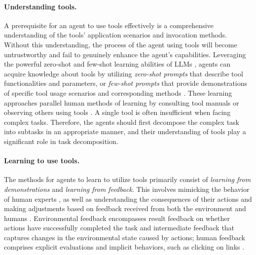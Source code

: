 \paragraph{Understanding tools.}
A prerequisite for an agent to use tools effectively is a comprehensive understanding of the tools' application scenarios and invocation methods. Without this understanding, the process of the agent using tools will become untrustworthy and fail to genuinely enhance the agent's capabilities. Leveraging the powerful zero-shot and few-shot learning abilities of LLMs \cite{radford2019language, DBLP:conf/nips/BrownMRSKDNSSAA20}, agents can acquire knowledge about tools by utilizing \textit{zero-shot prompts} that describe tool functionalities and parameters, or \textit{few-shot prompts} that provide demonstrations of specific tool usage scenarios and corresponding methods \cite{DBLP:journals/corr/abs-2302-04761, DBLP:journals/corr/abs-2205-12255}. These learning approaches parallel human methods of learning by consulting tool manuals or observing others using tools \cite{DBLP:journals/corr/abs-2304-08354}. A single tool is often insufficient when facing complex tasks. Therefore, the agents should first decompose the complex task into subtasks in an appropriate manner, and their understanding of tools play a significant role in task decomposition.

\paragraph{Learning to use tools.}
The methods for agents to learn to utilize tools primarily consist of \textit{learning from demonstrations} and \textit{learning from feedback}. This involves mimicking the behavior of human experts \cite{DBLP:journals/csur/HusseinGEJ17, DBLP:conf/icra/LiuGAL18, DBLP:conf/nips/BakerAZHTEHSC22}, as well as understanding the consequences of their actions and making adjustments based on feedback received from both the environment and humans \cite{ DBLP:conf/nips/Ouyang0JAWMZASR22,DBLP:journals/ijrr/LevinePKIQ18, DBLP:journals/corr/abs-2307-04964}. Environmental feedback encompasses result feedback on whether actions have successfully completed the task and intermediate feedback that captures changes in the environmental state caused by actions; human feedback comprises explicit evaluations and implicit behaviors, such as clicking on links \cite{DBLP:journals/corr/abs-2304-08354}.

